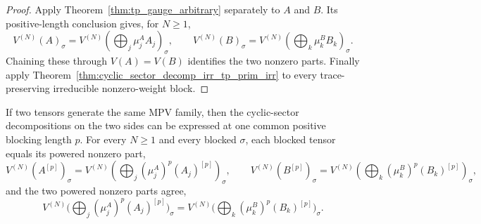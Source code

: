 \begin{proof}\leanok
    Apply Theorem~\ref{thm:tp_gauge_arbitrary} separately to $A$ and $B$. Its
    positive-length conclusion gives, for $N\ge 1$,
    \[
        V^{(N)}(A)_\sigma
        =
        V^{(N)}\!(\textstyle\bigoplus_j \mu^A_j A_j)_\sigma,
        \qquad
        V^{(N)}(B)_\sigma
        =
        V^{(N)}\!(\textstyle\bigoplus_k \mu^B_k B_k)_\sigma.
    \]
    Chaining these through $V(A)=V(B)$ identifies the two nonzero parts. Finally
    apply Theorem~\ref{thm:cyclic_sector_decomp_irr_tp_prim_irr} to
    every trace-preserving irreducible nonzero-weight block.
\end{proof}

\begin{theorem}%
    \label{thm:ft_after_blocking_common_length_common_sector_theorem}
    \leanok
    If two tensors generate the same MPV family, then the cyclic-sector
    decompositions on the two sides can be expressed at one common positive
    blocking length $p$. For every $N\ge 1$ and every blocked $\sigma$, each
    blocked tensor equals its powered nonzero part,
    \[
        V^{(N)}\!(A^{[p]})_\sigma
        =
        V^{(N)}\!(\textstyle\bigoplus_j (\mu^A_j)^p (A_j)^{[p]})_\sigma,
        \qquad
        V^{(N)}\!(B^{[p]})_\sigma
        =
        V^{(N)}\!(\textstyle\bigoplus_k (\mu^B_k)^p (B_k)^{[p]})_\sigma,
    \]
    and the two powered nonzero parts agree,
    \[
        V^{(N)}\!\bigl(\textstyle\bigoplus_j
        (\mu^A_j)^p (A_j)^{[p]}\bigr)_\sigma
        =
        V^{(N)}\!\bigl(\textstyle\bigoplus_k
        (\mu^B_k)^p (B_k)^{[p]}\bigr)_\sigma.
    \]
\end{theorem}

